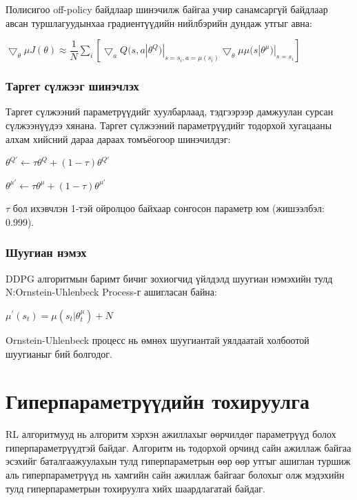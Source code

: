 \documentclass[12pt,A4]{report}
\begin{document}
Полисигоо off-policy байдлаар шинэчилж байгаа учир санамсаргүй байдлаар авсан туршлагуудынхаа градиентүүдийн нийлбэрийн дундаж утгыг авна:

\begin{center}
$\bigtriangledown_\theta\mu J(\theta) \approx \dfrac{1}{N} \sum_{i}[\bigtriangledown_a Q(s, a|\theta^Q)|_{s=s_i,a=\mu(s_i)}\bigtriangledown_\theta\mu \mu(s|\theta^\mu)|_{s=s_i}]$
\end{center}

\subsubsection{Таргет сүлжээг шинэчлэх}
 
Таргет сүлжээний параметрүүдийг хуулбарлаад, тэдгээрээр дамжуулан сурсан сүлжээнүүдээ хянана. Таргет сүлжээний параметрүүдийг тодорхой хугацааны алхам хийсний дараа дараах томъёогоор шинэчилдэг:

\begin{center}
$\theta^{Q{'}} \longleftarrow \tau\theta^Q + (1-\tau)\theta^{Q{'}}$ 

$\theta^{\mu{'}} \longleftarrow \tau\theta^\mu + (1-\tau)\theta^{\mu{'}}$ 

$\tau $ бол ихэвчлэн 1-тэй ойролцоо байхаар сонгосон параметр юм (жишээлбэл: 0.999).
\end{center}

\subsubsection{Шуугиан нэмэх}

DDPG алгоритмын баримт бичиг зохиогчид үйлдэлд шуугиан нэмэхийн тулд N:Ornstein-Uhlenbeck Process-г ашигласан байна:

\begin{center}
$\mu^{'}(s_t) = \mu(s_t|\theta_t^\mu) + N$
\end{center}

Ornstein-Uhlenbeck процесс нь өмнөх шуугиантай уялдаатай холбоотой шуугианыг бий болгодог.

\section{Гиперпараметрүүдийн тохируулга}

RL алгоритмууд нь алгоритм хэрхэн ажиллахыг өөрчилдөг параметрүүд болох гиперпараметрүүдтэй байдаг. Алгоритм нь тодорхой орчинд сайн ажиллаж байгаа эсэхийг баталгаажуулахын тулд гиперпараметрын өөр өөр утгыг ашиглан туршиж аль гиперпараметрүүд нь хамгийн сайн ажиллаж байгааг болохыг олж мэдэхийн тулд гиперпараметрын тохируулга хийх шаардлагатай байдаг.
\end{document}
